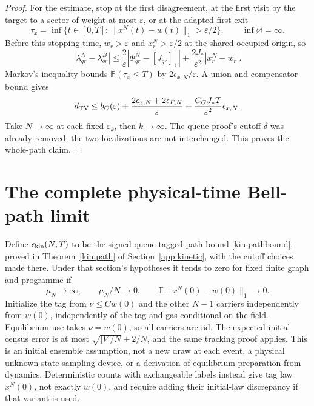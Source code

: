 \documentclass[11pt]{article}
\theoremstyle{definition}\newtheorem{definition}[theorem]{Definition}
\theoremstyle{remark}\newtheorem{remark}[theorem]{Remark}
\newcommand{\E}{\mathbb E}\newcommand{\Prb}{\mathbb P}
\begin{document}
\begin{proof}
For the estimate, stop at the first disagreement, at the first visit by the target to a sector of weight at most $\varepsilon$, or at the adapted first exit
\[
 \tau_x=\inf\{t\in[0,T]:\|x^N(t)-w(t)\|_1>\varepsilon/2\},\qquad\inf\varnothing=\infty.
\]
Before this stopping time, $w_r>\varepsilon$ and $x_r^N>\varepsilon/2$ at the shared occupied origin, so
\[
 |\lambda^N_{qr}-\lambda^B_{qr}|
 \le\frac2\varepsilon|\Phi^N_{qr}-[J_{qr}]_+|
 +\frac{2J_*}{\varepsilon^2}|x_r^N-w_r|.
\]
Markov's inequality bounds $\Prb(\tau_x\le T)$ by $2\epsilon_{x,N}/\varepsilon$. A union and compensator bound gives
\begin{equation}
 d_{\mathrm{TV}}\le b_C(\varepsilon)
 +\frac{2\epsilon_{x,N}+2\epsilon_{F,N}}{\varepsilon}
 +\frac{C_GJ_*T}{\varepsilon^2}\epsilon_{x,N}.
 \label{kin:pathbound}
\end{equation}
Take $N\to\infty$ at each fixed $\varepsilon_k$, then $k\to\infty$.
The queue proof's cutoff $\delta$ was already removed; the two
localizations are not interchanged. This proves the whole-path claim.
\end{proof}

\section{The complete physical-time Bell-path limit}\label{sec:mainlimit}
Define $\epsilon_{\rm kin}(N,T)$ to be the signed-queue tagged-path bound \eqref{kin:pathbound}, proved in Theorem~\ref{kin:path} of Section~\ref{app:kinetic}, with the cutoff choices made there. Under that section's hypotheses it tends to zero for fixed finite graph and programme if
\begin{equation}
 \mu_N\longrightarrow\infty,\qquad \mu_N/N\longrightarrow0,
 \qquad \E\|x^N(0)-w(0)\|_1\longrightarrow0.
 \label{eq:kineticscale}
\end{equation}
Initialize the tag from $\nu\le Cw(0)$ and the other $N-1$ carriers independently from $w(0)$, independently of the tag and gas conditional on the field. Equilibrium use takes $\nu=w(0)$, so all carriers are iid. The expected initial census error is at most $\sqrt{|V|/N}+2/N$, and the same tracking proof applies. This is an initial ensemble assumption, not a new draw at each event, a physical unknown-state sampling device, or a derivation of equilibrium preparation from dynamics. Deterministic counts with exchangeable labels instead give tag law $x^N(0)$, not exactly $w(0)$, and require adding their initial-law discrepancy if that variant is used.
\end{document}
